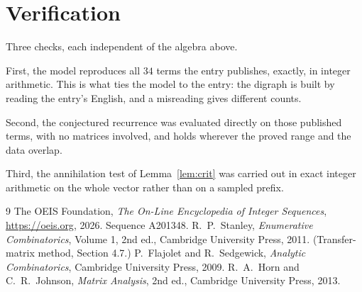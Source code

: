 \documentclass[11pt,a4paper]{article}
\theoremstyle{plain}
\theoremstyle{definition}
\begin{document}
\section{Verification}

Three checks, each independent of the algebra above.

First, the model reproduces all $34$ terms the entry publishes, exactly, in integer
arithmetic. This is what ties the model to the entry: the digraph is built by reading the
entry's English, and a misreading gives different counts.

Second, the conjectured recurrence was evaluated directly on those published terms, with no
matrices involved, and holds wherever the proved range and the data overlap.

Third, the annihilation test of Lemma~\ref{lem:crit} was carried out in exact integer
arithmetic on the whole vector rather than on a sampled prefix.

\begin{thebibliography}{9}
 The OEIS Foundation, \emph{The On-Line Encyclopedia of Integer
Sequences}, \url{https://oeis.org}, 2026. Sequence A201348.
 R.~P.~Stanley, \emph{Enumerative Combinatorics}, Volume 1, 2nd ed.,
Cambridge University Press, 2011. (Transfer-matrix method, Section 4.7.)
 P.~Flajolet and R.~Sedgewick, \emph{Analytic Combinatorics}, Cambridge
University Press, 2009.
 R.~A.~Horn and C.~R.~Johnson, \emph{Matrix Analysis}, 2nd ed., Cambridge
University Press, 2013.
\end{thebibliography}
\end{document}
